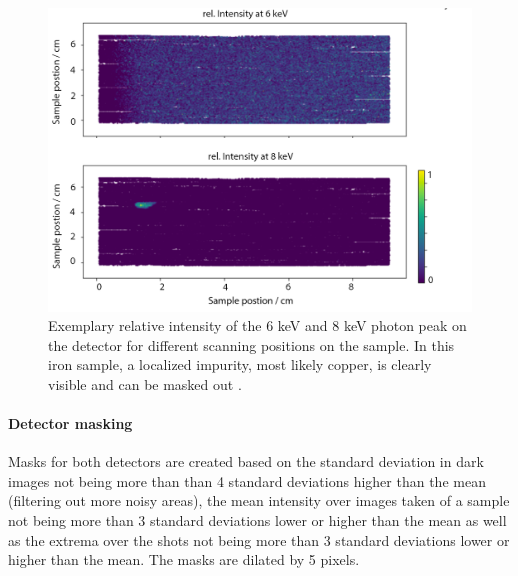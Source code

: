 \begin{figure}
	\centering
	\includegraphics[width=0.7\linewidth]{images/xrf.png}
	\caption[Exemplary relative intensity of the 6 keV and 8 keV photon peak on the detector for different scanning positions on the sample]{Exemplary relative intensity of the 6 keV and 8 keV photon peak on the detector for different scanning positions on the sample. In this iron sample, a localized impurity, most likely copper, is clearly visible and can be masked out .}
	\label{fig:xrf}
\end{figure}

\paragraph{Detector masking}
Masks for both detectors are created based on the standard deviation in dark images not being more than than 4 standard deviations higher than the mean (filtering out more noisy areas), the mean intensity over images taken of a sample not being more than 3 standard deviations lower or higher than the mean as well as the extrema over the shots not being more than 3 standard deviations lower or higher than the mean. The masks are  dilated by 5 pixels.

